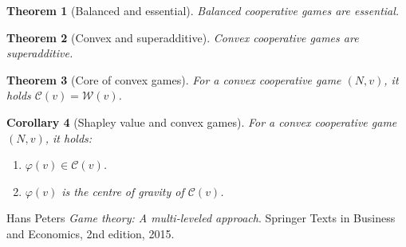 \documentclass[12pt]{report}
\newcounter{theorem}
\newtheorem{theorem}{Theorem}
\newtheorem{corollary}[theorem]{Corollary}
\def\phi{\varphi}
\begin{document}
\begin{theorem}[Balanced and essential]
  Balanced cooperative games are essential.
\end{theorem}

\begin{theorem}[Convex and superadditive]
  Convex cooperative games are superadditive.
\end{theorem}

\begin{theorem}[Core of convex games]
  For a convex cooperative game $(N,v)$, it holds $\mathcal{C}(v)=\mathcal{W}(v)$.
\end{theorem}

\begin{corollary}[Shapley value and convex games]
  For a convex cooperative game $(N,v)$, it holds:
	\begin{enumerate}
		\item $\phi(v) \in \mathcal{C}(v)$.
		\item $\phi(v)$ is the centre of gravity of $\mathcal{C}(v)$.
	\end{enumerate}
\end{corollary}

\literaturestart
	
Hans Peters 
\textit{Game theory: A multi-leveled approach}. 
Springer Texts in Business and Economics, 2nd edition, 2015.
 

\literatureend
\end{document}
